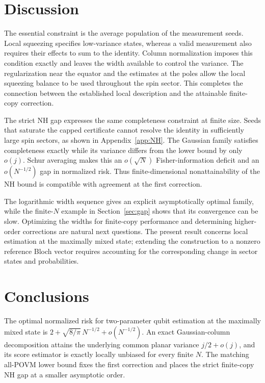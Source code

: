 \documentclass[aps,pra,reprint,superscriptaddress,longbibliography]{revtex4-2}
\theoremstyle{remark}
\begin{document}
\section{Discussion}\label{sec:discussion}

The essential constraint is the average population of the measurement
seeds. Local squeezing specifies low-variance states, whereas a valid
measurement also requires their effects to sum to the identity. Column
normalization imposes this condition exactly and leaves the width
available to control the variance. The regularization near the equator
and the estimates at the poles allow the local squeezing balance to be
used throughout the spin sector. This completes the connection between
the established local description \cite{He2011,Dammeier2015} and the
attainable finite-copy correction.

The strict NH gap expresses the same completeness constraint at finite
size. Seeds that saturate the capped certificate cannot resolve the
identity in sufficiently large spin sectors, as shown in
Appendix~\ref{app:NH}. The Gaussian family satisfies completeness
exactly while its variance differs from the lower bound by only $o(j)$.
Schur averaging makes this an $o(\sqrt N)$ Fisher-information deficit
and an $o(N^{-1/2})$ gap in normalized risk. Thus finite-dimensional
nonattainability of the NH bound is compatible with agreement at the
first correction.

The logarithmic width sequence gives an explicit asymptotically optimal
family, while the finite-$N$ example in Section~\ref{sec:gap} shows that
its convergence can be slow. Optimizing the widths for finite-copy
performance and determining higher-order corrections are natural next
questions. The present result concerns local estimation at the maximally
mixed state; extending the construction to a nonzero reference Bloch
vector requires accounting for the corresponding change in sector
states and probabilities.

\section{Conclusions}\label{sec:conclusions}

The optimal normalized risk for two-parameter qubit estimation at the
maximally mixed state is
$2+\sqrt{8/\pi}\,N^{-1/2}+o(N^{-1/2})$.
An exact Gaussian-column decomposition attains the underlying common
planar variance $j/2+o(j)$, and its score estimator is exactly locally
unbiased for every finite $N$. The matching all-POVM lower bound fixes
the first correction and places the strict finite-copy NH gap at a
smaller asymptotic order.
\end{document}
